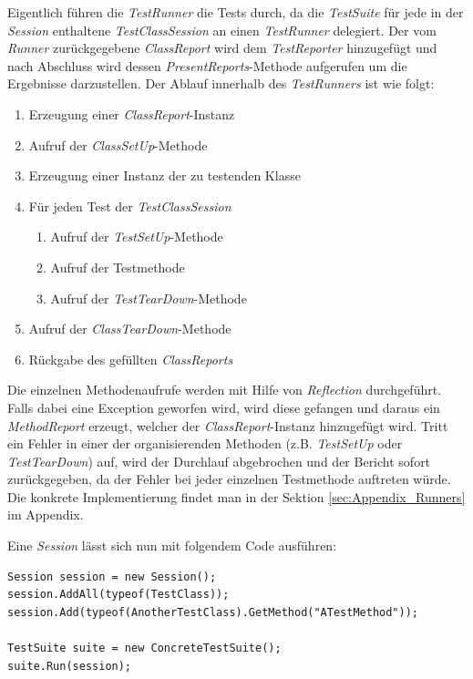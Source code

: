 Eigentlich führen die \textit{TestRunner} die Tests durch, da die \textit{TestSuite} für jede in der \textit{Session} enthaltene \textit{TestClassSession} an einen \textit{TestRunner} delegiert. Der vom \textit{Runner} zurückgegebene \textit{ClassReport} wird dem \textit{TestReporter} hinzugefügt und nach Abschluss wird dessen \textit{PresentReports}-Methode aufgerufen um die Ergebnisse darzustellen. Der Ablauf innerhalb des \textit{TestRunners} ist wie folgt:
\begin{enumerate}
\item Erzeugung einer \textit{ClassReport}-Instanz
\item Aufruf der \textit{ClassSetUp}-Methode
\item Erzeugung einer Instanz der zu testenden Klasse
\item Für jeden Test der \textit{TestClassSession}
	\begin{enumerate}[label*=\arabic*.]
	\item Aufruf der \textit{TestSetUp}-Methode
	\item Aufruf der Testmethode
	\item Aufruf der \textit{TestTearDown}-Methode
	\end{enumerate}
\item Aufruf der \textit{ClassTearDown}-Methode
\item Rückgabe des gefüllten \textit{ClassReports}
\end{enumerate}

Die einzelnen Methodenaufrufe werden mit Hilfe von \textit{Reflection} durchgeführt. Falls dabei eine Exception geworfen wird, wird diese gefangen und daraus ein \textit{MethodReport} erzeugt, welcher der \textit{ClassReport}-Instanz hinzugefügt wird. Tritt ein Fehler in einer der organisierenden Methoden (z.B. \textit{TestSetUp} oder \textit{TestTearDown}) auf, wird der Durchlauf abgebrochen und der Bericht sofort zurückgegeben, da der Fehler bei jeder einzelnen Testmethode auftreten würde. Die konkrete Implementierung findet man in der Sektion \ref{sec:Appendix_Runners}  im Appendix.

Eine \textit{Session} lässt sich nun mit folgendem Code ausführen:
\begin{lstlisting}[caption={[Beispiel für die Ausführung einer \textit{Session}]Beispiel für die Ausführung einer \textit{Session}\\\textit{ConcreteTestSuite} ist stellvertretend für eine beliebige Implementierung von \textit{AbstractTestSuite}.}, label=code:Example_SessionCreation]
Session session = new Session();
session.AddAll(typeof(TestClass));
session.Add(typeof(AnotherTestClass).GetMethod("ATestMethod"));

TestSuite suite = new ConcreteTestSuite();
suite.Run(session);
\end{lstlisting}
\clearpage

